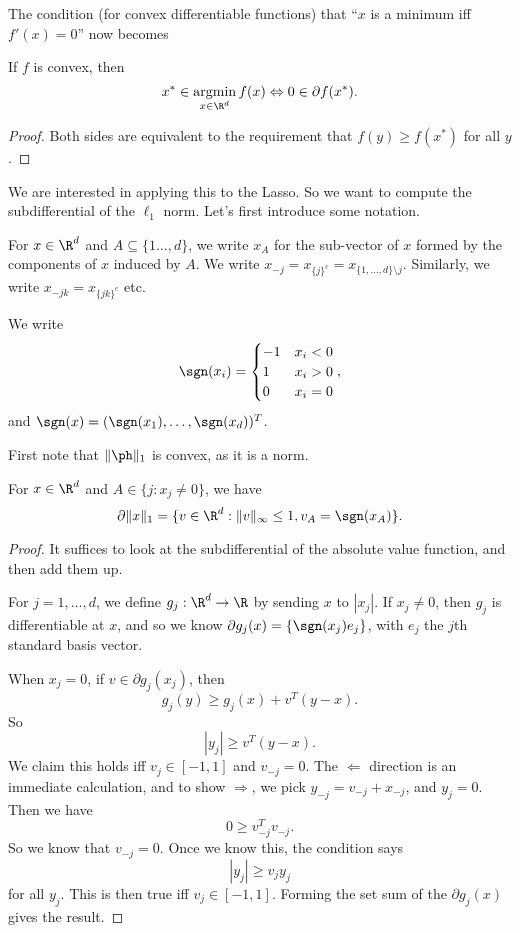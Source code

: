 \documentclass[a4paper]{article}
\DeclareMathOperator*\argmin{argmin}
\begin{document}
The condition (for convex differentiable functions) that ``$x$ is a minimum iff $f'(x) = 0$'' now becomes
\begin{prop}
  If $f$ is convex, then
  \[
    x^* \in \argmin_{x \in \R^d} f(x) \Leftrightarrow 0 \in \partial f(x^*).
  \]
\end{prop}

\begin{proof}
  Both sides are equivalent to the requirement that $f(y) \geq f(x^*)$ for all $y$.
\end{proof}

We are interested in applying this to the Lasso. So we want to compute the subdifferential of the $\ell_1$ norm. Let's first introduce some notation.

\begin{notation}
  For $x \in \R^d$ and $A \subseteq \{1 \ldots, d\}$, we write $x_A$ for the sub-vector of $x$ formed by the components of $x$ induced by $A$. We write $x_{-j} = x_{\{j\}^c} = x_{\{1, \ldots, d\} \setminus j}$. Similarly, we write $x_{-jk} = x_{\{jk\}^c}$ etc.

  We write\index{$\sgn$}
  \[
    \sgn(x_i) =
    \begin{cases}
      -1 & x_i < 0\\
      1 & x_i > 0\\
      0 & x_i = 0
    \end{cases},
  \]
  and $\sgn(x) = (\sgn(x_1), \ldots, \sgn(x_d))^T$.
\end{notation}

First note that $\|\ph\|_1$ is convex, as it is a norm.

\begin{prop}
  For $x \in \R^d$ and $A \in \{j: x_j \not= 0\}$, we have
  \[
    \partial \|x\|_1 = \{v \in \R^d: \|v\|_\infty \leq 1, v_A = \sgn (x_A)\}.
  \]
\end{prop}

\begin{proof}
  It suffices to look at the subdifferential of the absolute value function, and then add them up.

  For $j = 1, \ldots, d$, we define $g_j: \R^d \to \R$ by sending $x$ to $|x_j|$. If $x_j \not= 0$, then $g_j$ is differentiable at $x$, and so we know $\partial g_j (x) = \{\sgn(x_j) e_j\}$, with $e_j$ the $j$th standard basis vector.

  When $x_j = 0$, if $v \in \partial g_j(x_j)$, then
  \[
    g_j(y) \geq g_j(x) + v^T(y - x).
  \]
  So
  \[
    |y_j| \geq v^T (y - x).
  \]
  We claim this holds iff $v_j \in [-1, 1]$ and $v_{-j} = 0$. The $\Leftarrow$ direction is an immediate calculation, and to show $\Rightarrow$, we pick $y_{-j} = v_{-j} + x_{-j}$, and $y_j = 0$. Then we have
  \[
    0 \geq v_{-j}^T v_{-j}.
  \]
  So we know that $v_{-j} = 0$. Once we know this, the condition says
  \[
    |y_j| \geq v_j y_j
  \]
  for all $y_j$. This is then true iff $v_j \in [-1, 1]$. Forming the set sum of the $\partial g_j(x)$ gives the result.
\end{proof}
\end{document}
